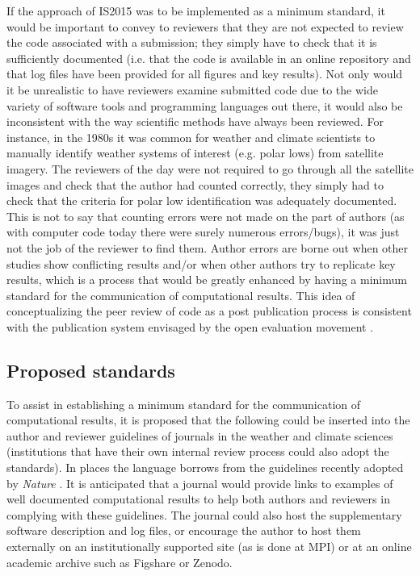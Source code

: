 If the approach of IS2015 was to be implemented as a minimum standard, it would be important to convey to reviewers that they are not expected to review the code associated with a submission; they simply have to check that it is sufficiently documented (i.e. that the code is available in an online repository and that log files have been provided for all figures and key results). Not only would it be unrealistic to have reviewers examine submitted code due to the wide variety of software tools and programming languages out there, it would also be inconsistent with the way scientific methods have always been reviewed. For instance, in the 1980s it was common for weather and climate scientists to manually identify weather systems of interest (e.g. polar lows) from satellite imagery. The reviewers of the day were not required to go through all the satellite images and check that the author had counted correctly, they simply had to check that the criteria for polar low identification was adequately documented. This is not to say that counting errors were not made on the part of authors (as with computer code today there were surely numerous errors/bugs), it was just not the job of the reviewer to find them. Author errors are borne out when other studies show conflicting results and/or when other authors try to replicate key results, which is a process that would be greatly enhanced by having a minimum standard for the communication of computational results. This idea of conceptualizing the peer review of code as a post publication process is consistent with the publication system envisaged by the open evaluation movement \citep[e.g.][]{Kriegeskorte2012}. 
  
\subsection{Proposed standards}

To assist in establishing a minimum standard for the communication of computational results, it is proposed that the following could be inserted into the author and reviewer guidelines of journals in the weather and climate sciences (institutions that have their own internal review process could also adopt the standards). In places the language borrows from the guidelines recently adopted by \textit{Nature} \citep{Nature2014}. It is anticipated that a journal would provide links to examples of well documented computational results to help both authors and reviewers in complying with these guidelines. The journal could also host the supplementary software description and log files, or encourage the author to host them externally on an institutionally supported site (as is done at MPI) or at an online academic archive such as Figshare or Zenodo.

